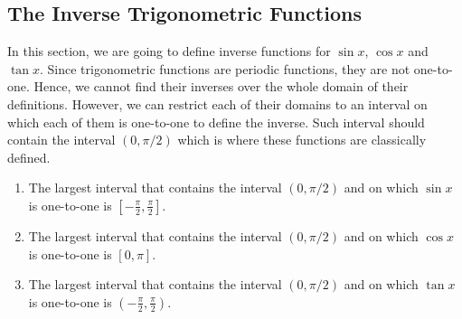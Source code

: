 \subsection{The Inverse Trigonometric Functions}
In this section, we are going to define inverse functions for $\sin x$, $\cos x$ and $\tan x$.
Since trigonometric functions are periodic functions, they are not one-to-one. Hence, we cannot find their inverses over the whole domain of their definitions. However, we can restrict each of  their domains to  an interval on which each of  them is one-to-one to define the inverse. Such interval should contain the interval $(0, \pi/2)$ which is where these functions are classically defined. 

\begin{enumerate}[$\bullet$\;\;]
\item The largest interval that contains  the interval $(0, \pi/2)$ and on which $\sin x$ is one-to-one is $[-\frac{\pi}{2}, \frac{\pi}{2}]$.
\item The largest interval that contains  the interval $(0, \pi/2)$ and on which $\cos x$ is one-to-one is $[0, \pi]$.
\item The largest interval that contains  the interval $(0, \pi/2)$ and on which $\tan x$ is one-to-one is $(-\frac{\pi}{2}, \frac{\pi}{2})$.
\end{enumerate}

